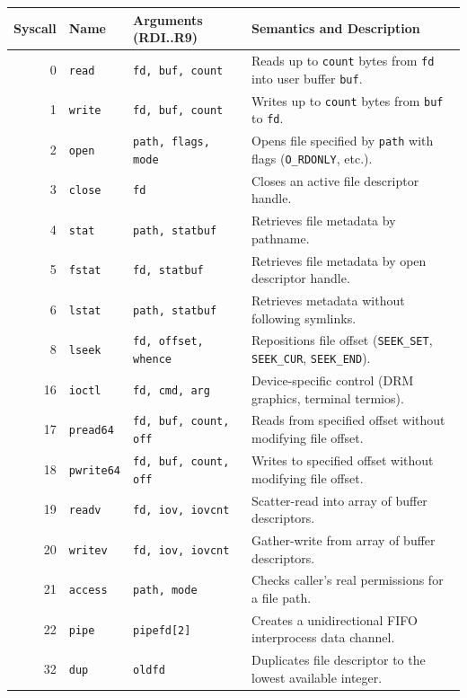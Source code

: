 \begin{table}[htbp]
\centering
\small
\begin{tabularx}{\textwidth}{rllX}
\toprule
\textbf{Syscall} & \textbf{Name} & \textbf{Arguments (RDI..R9)} & \textbf{Semantics and Description} \\
\midrule
0 & \texttt{read} & \texttt{fd, buf, count} & Reads up to \texttt{count} bytes from \texttt{fd} into user buffer \texttt{buf}. \\
1 & \texttt{write} & \texttt{fd, buf, count} & Writes up to \texttt{count} bytes from \texttt{buf} to \texttt{fd}. \\
2 & \texttt{open} & \texttt{path, flags, mode} & Opens file specified by \texttt{path} with flags (\texttt{O\_RDONLY}, etc.). \\
3 & \texttt{close} & \texttt{fd} & Closes an active file descriptor handle. \\
4 & \texttt{stat} & \texttt{path, statbuf} & Retrieves file metadata by pathname. \\
5 & \texttt{fstat} & \texttt{fd, statbuf} & Retrieves file metadata by open descriptor handle. \\
6 & \texttt{lstat} & \texttt{path, statbuf} & Retrieves metadata without following symlinks. \\
8 & \texttt{lseek} & \texttt{fd, offset, whence} & Repositions file offset (\texttt{SEEK\_SET}, \texttt{SEEK\_CUR}, \texttt{SEEK\_END}). \\
16 & \texttt{ioctl} & \texttt{fd, cmd, arg} & Device-specific control (DRM graphics, terminal termios). \\
17 & \texttt{pread64} & \texttt{fd, buf, count, off} & Reads from specified offset without modifying file offset. \\
18 & \texttt{pwrite64} & \texttt{fd, buf, count, off} & Writes to specified offset without modifying file offset. \\
19 & \texttt{readv} & \texttt{fd, iov, iovcnt} & Scatter-read into array of buffer descriptors. \\
20 & \texttt{writev} & \texttt{fd, iov, iovcnt} & Gather-write from array of buffer descriptors. \\
21 & \texttt{access} & \texttt{path, mode} & Checks caller's real permissions for a file path. \\
22 & \texttt{pipe} & \texttt{pipefd[2]} & Creates a unidirectional FIFO interprocess data channel. \\
32 & \texttt{dup} & \texttt{oldfd} & Duplicates file descriptor to the lowest available integer. \\

\end{tabularx}
\end{table}
